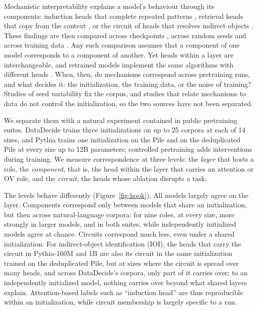 \documentclass[11pt]{article}
\begin{document}
Mechanistic interpretability explains a model's behaviour through its components: induction heads that complete repeated patterns \citep{olsson2022context}, retrieval heads that copy from the context \citep{wu2025retrieval}, or the circuit of heads that resolves indirect objects \citep{wang2023interpretability}.
These findings are then compared across checkpoints \citep{tigges2024llm}, across random seeds \citep{bali2026quantifying} and across training data \citep{chen2026mechanistic}.
Any such comparison assumes that a component of one model corresponds to a component of another.
Yet heads within a layer are interchangeable, and retrained models implement the same algorithms with different heads \citep{chughtai2023toy,tigges2024llm,bali2026quantifying}.
When, then, do mechanisms correspond across pretraining runs, and what decides it: the initialization, the training data, or the noise of training?
Studies of seed variability fix the corpus, and studies that relate mechanisms to data do not control the initialization, so the two sources have not been separated.

We separate them with a natural experiment contained in public pretraining suites.
DataDecide \citep{magnusson2025datadecide} trains three initializations on up to 25 corpora at each of 14 sizes, and Pythia \citep{biderman2023pythia} trains one initialization on the Pile and on the deduplicated Pile at every size up to 12B parameters; controlled pretraining adds interventions during training.
We measure correspondence at three levels: the \emph{layer} that hosts a role, the \emph{component}, that is, the head within the layer that carries an attention or OV role, and the \emph{circuit}, the heads whose ablation disrupts a task.

The levels behave differently (Figure~\ref{fig:hook}).
All models largely agree on the layer.
Components correspond only between models that share an initialization, but then across natural-language corpora: for nine roles, at every size, more strongly in larger models, and in both suites, while independently initialized models agree at chance.
Circuits correspond much less, even under a shared initialization.
For indirect-object identification (IOI), the heads that carry the circuit in Pythia-160M and 1B are also its circuit in the same initialization trained on the deduplicated Pile, but at sizes where the circuit is spread over many heads, and across DataDecide's corpora, only part of it carries over; to an independently initialized model, nothing carries over beyond what shared layers explain.
Attention-based labels such as ``induction head'' are thus reproducible within an initialization, while circuit membership is largely specific to a run.
\end{document}
